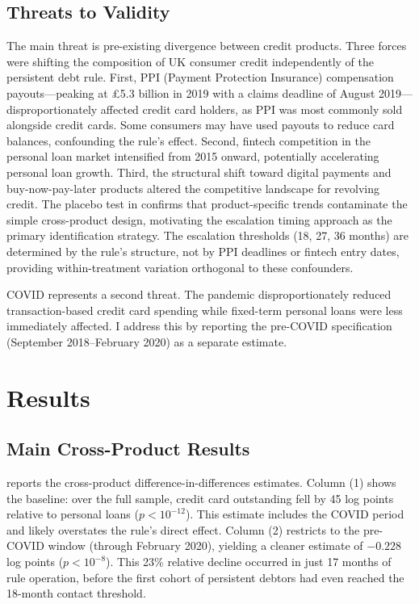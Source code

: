 \documentclass[12pt]{article}
\begin{document}
\subsection{Threats to Validity}

The main threat is pre-existing divergence between credit products. Three forces were shifting the composition of UK consumer credit independently of the persistent debt rule. First, PPI (Payment Protection Insurance) compensation payouts---peaking at \pounds5.3 billion in 2019 with a claims deadline of August 2019---disproportionately affected credit card holders, as PPI was most commonly sold alongside credit cards. Some consumers may have used payouts to reduce card balances, confounding the rule's effect. Second, fintech competition in the personal loan market intensified from 2015 onward, potentially accelerating personal loan growth. Third, the structural shift toward digital payments and buy-now-pay-later products altered the competitive landscape for revolving credit. The placebo test in  confirms that product-specific trends contaminate the simple cross-product design, motivating the escalation timing approach as the primary identification strategy. The escalation thresholds (18, 27, 36 months) are determined by the rule's structure, not by PPI deadlines or fintech entry dates, providing within-treatment variation orthogonal to these confounders.

COVID represents a second threat. The pandemic disproportionately reduced transaction-based credit card spending while fixed-term personal loans were less immediately affected. I address this by reporting the pre-COVID specification (September 2018--February 2020) as a separate estimate.

\section{Results}

\subsection{Main Cross-Product Results}



 reports the cross-product difference-in-differences estimates. Column (1) shows the baseline: over the full sample, credit card outstanding fell by 45 log points relative to personal loans ($p < 10^{-12}$). This estimate includes the COVID period and likely overstates the rule's direct effect. Column (2) restricts to the pre-COVID window (through February 2020), yielding a cleaner estimate of $-0.228$ log points ($p < 10^{-8}$). This 23\% relative decline occurred in just 17 months of rule operation, before the first cohort of persistent debtors had even reached the 18-month contact threshold.
\end{document}
